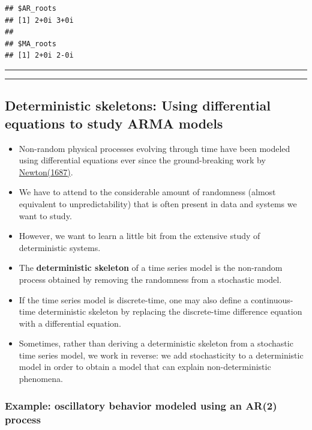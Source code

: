 \documentclass[]{article}
\begin{document}
\begin{verbatim}
## $AR_roots
## [1] 2+0i 3+0i
## 
## $MA_roots
## [1] 2+0i 2-0i
\end{verbatim}

\begin{center}\rule{0.5\linewidth}{\linethickness}\end{center}

\begin{center}\rule{0.5\linewidth}{\linethickness}\end{center}

\subsection{Deterministic skeletons: Using differential equations to
study ARMA
models}\label{deterministic-skeletons-using-differential-equations-to-study-arma-models}

\begin{itemize}
\item
  Non-random physical processes evolving through time have been modeled
  using differential equations ever since the ground-breaking work by
  \href{https://en.wikipedia.org/wiki/Philosophi\%C3\%A6_Naturalis_Principia_Mathematica}{Newton(1687)}.
\item
  We have to attend to the considerable amount of randomness (almost
  equivalent to unpredictability) that is often present in data and
  systems we want to study.
\item
  However, we want to learn a little bit from the extensive study of
  deterministic systems.
\item
  The \textbf{deterministic skeleton} of a time series model is the
  non-random process obtained by removing the randomness from a
  stochastic model.
\item
  If the time series model is discrete-time, one may also define a
  continuous-time deterministic skeleton by replacing the discrete-time
  difference equation with a differential equation.
\item
  Sometimes, rather than deriving a deterministic skeleton from a
  stochastic time series model, we work in reverse: we add stochasticity
  to a deterministic model in order to obtain a model that can explain
  non-deterministic phenomena.
\end{itemize}

\subsubsection{Example: oscillatory behavior modeled using an AR(2)
process}\label{example-oscillatory-behavior-modeled-using-an-ar2-process}
\end{document}
